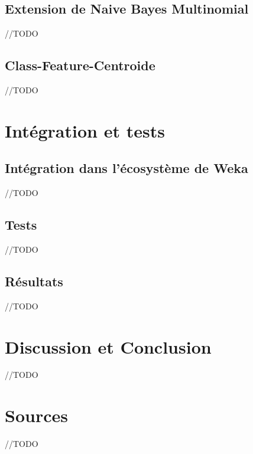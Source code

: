 \documentclass{article}
\begin{document}
\subsection{Extension de Naive Bayes Multinomial}
//TODO
\subsection{Class-Feature-Centroide}
//TODO



\section{Intégration et tests}
\subsection{Intégration dans l'écosystème de Weka}
//TODO
\subsection{Tests}
//TODO
\subsection{Résultats}
//TODO



\section{Discussion et Conclusion }
//TODO

\newpage
\section{Sources}
//TODO



\end{document}
